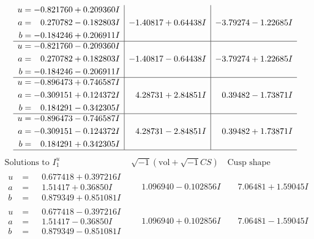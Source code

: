 \documentclass[1p]{elsarticle_modified}
\theoremstyle{definition}
\newcommand{\I}{\sqrt{-1}}
\begin{document}
$$\begin{array}{c|c|c}
\begin{aligned}
u &= -0.821760 + 0.209360 I \\
a &= \phantom{-}0.270782 - 0.182803 I \\
b &= -0.184246 + 0.206911 I\end{aligned}
 & -1.40817 + 0.64438 I & -3.79274 - 1.22685 I \\ \hline\begin{aligned}
u &= -0.821760 - 0.209360 I \\
a &= \phantom{-}0.270782 + 0.182803 I \\
b &= -0.184246 - 0.206911 I\end{aligned}
 & -1.40817 - 0.64438 I & -3.79274 + 1.22685 I \\ \hline\begin{aligned}
u &= -0.896473 + 0.746587 I \\
a &= -0.309151 + 0.124372 I \\
b &= \phantom{-}0.184291 - 0.342305 I\end{aligned}
 & \phantom{-}4.28731 + 2.84851 I & \phantom{-}0.39482 - 1.73871 I \\ \hline\begin{aligned}
u &= -0.896473 - 0.746587 I \\
a &= -0.309151 - 0.124372 I \\
b &= \phantom{-}0.184291 + 0.342305 I\end{aligned}
 & \phantom{-}4.28731 - 2.84851 I & \phantom{-}0.39482 + 1.73871 I\\
 \hline 
 \end{array}$$\newpage$$\begin{array}{c|c|c}  
\text{Solutions to }I^u_{1}& \I (\text{vol} + \sqrt{-1}CS) & \text{Cusp shape}\\
 \hline 
\begin{aligned}
u &= \phantom{-}0.677418 + 0.397216 I \\
a &= \phantom{-}1.51417 + 0.36850 I \\
b &= \phantom{-}0.879349 + 0.851081 I\end{aligned}
 & \phantom{-}1.096940 - 0.102856 I & \phantom{-}7.06481 + 1.59045 I \\ \hline\begin{aligned}
u &= \phantom{-}0.677418 - 0.397216 I \\
a &= \phantom{-}1.51417 - 0.36850 I \\
b &= \phantom{-}0.879349 - 0.851081 I\end{aligned}
 & \phantom{-}1.096940 + 0.102856 I & \phantom{-}7.06481 - 1.59045 I \\ \hline\begin{aligned}

\end{aligned}
\end{array}$$
\end{document}
